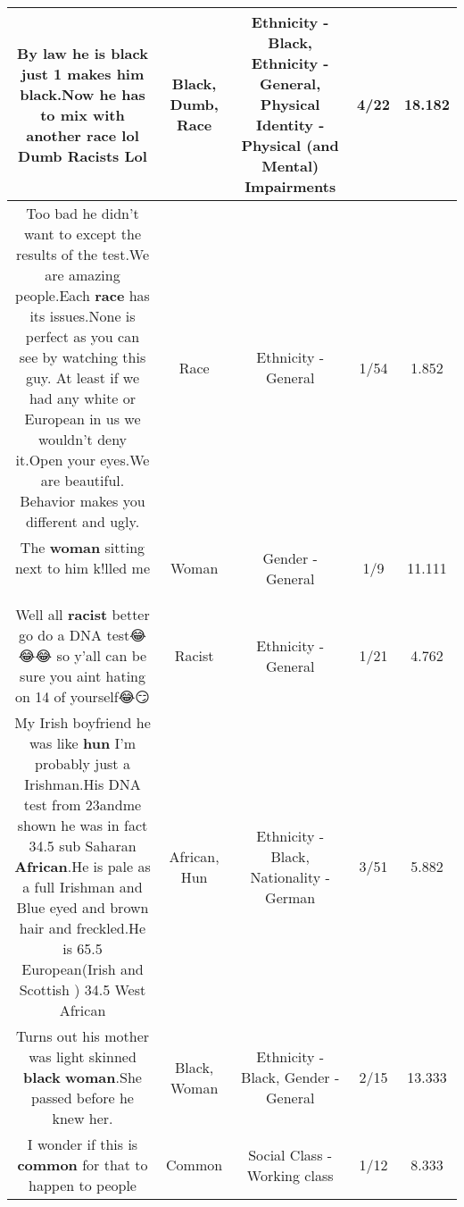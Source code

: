 \documentclass[11pt]{article}
\newlength\mylength
\begin{document}
\begin{center}
\begin{longtable}{|C{.65\mylength}|C{.30\mylength}|C{.12\mylength}|C{.12\mylength}|C{.12\mylength}|}
  \small By law he is \textbf{black} just 1 makes him \textbf{black}.Now he has to mix with another \textbf{race} lol \textbf{Dumb} Racists Lol\normalsize   & Black, Dumb, Race & Ethnicity - Black, Ethnicity - General, Physical Identity - Physical (and Mental) Impairments & 4/22 & 18.182 \\  \hline
  \small Too bad he didn't want to except the results of the test.We are amazing people.Each \textbf{race} has its issues.None is perfect as you can see by watching this guy. At least if we had any white or European in us we wouldn't deny it.Open your eyes.We are beautiful. Behavior makes you different and ugly.\normalsize   & Race & Ethnicity - General & 1/54 & 1.852 \\  \hline
  \small The \textbf{woman} sitting next to him k!lled me 🤣🤣🤣\normalsize   & Woman & Gender - General & 1/9 & 11.111 \\  \hline
  \small Well all \textbf{racist} better go do a DNA test😂😂😂 so y'all can be sure you aint hating on 14 of yourself😂😏\normalsize   & Racist & Ethnicity - General & 1/21 & 4.762 \\  \hline
  \small My Irish boyfriend he was like \textbf{hun} I'm probably just a Irishman.His DNA test from 23andme shown he was in fact 34.5 sub Saharan \textbf{African}.He is pale as a full Irishman and Blue eyed and brown hair and freckled.He is 65.5 European(Irish and Scottish )  34.5 West African\normalsize   & African, Hun & Ethnicity - Black, Nationality - German & 3/51 & 5.882 \\  \hline
  \small Turns out his mother was light skinned \textbf{black} \textbf{woman}.She passed before he knew her.\normalsize   & Black, Woman & Ethnicity - Black, Gender - General & 2/15 & 13.333 \\  \hline
  \small I wonder if this is \textbf{common} for that to happen to people\normalsize   & Common & Social Class - Working class & 1/12 & 8.333 \\  \hline

\end{longtable}
\end{center}
\end{document}
